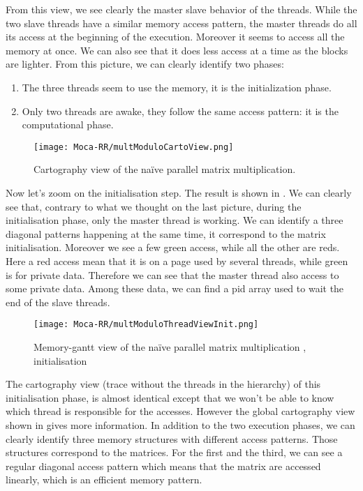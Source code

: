 From this view, we see clearly the master slave behavior of the threads.
While the two slave threads have a similar memory access pattern, the master threads do all its access at the beginning of the execution.
Moreover it seems to access all the memory at once.
We can also see that it does less access at a time as the blocks are lighter.
From this picture, we can clearly identify two phases:
\begin{enumerate}
    \item The three threads seem to use the memory, it is the initialization phase.
    \item Only two threads are awake, they follow the same access pattern: it
        is the computational phase.
\end{enumerate}

\begin{figure}[htb]
    \centering
    \texttt{[image: Moca-RR/multModuloCartoView.png]}
    \caption{Cartography view of the naïve parallel matrix multiplication.}
    \label{fig:ocelotl-carto0}
\end{figure}

Now let's zoom on the initialisation step.
The result is shown in .
We can clearly see that, contrary to what we thought on the last picture, during the initialisation phase, only the master thread is working.
We can identify a three diagonal patterns happening at the same time, it correspond to the matrix initialisation.
Moreover we see a few green access, while all the other are reds.
Here a red access mean that it is on a page used by several threads, while green is for private data.
Therefore we can see that the master thread also access to some private data.
Among these data, we can find a pid array used to wait the end of the slave threads.

\begin{figure}[htb]
    \centering
    \texttt{[image: Moca-RR/multModuloThreadViewInit.png]}
    \caption{Memory-gantt view of the naïve parallel matrix multiplication ,
    initialisation}
    \label{fig:ocelotl-th1}
\end{figure}

The cartography view (trace without the threads in the hierarchy) of this initialisation phase, is almost identical except that we won't be able to know which thread is responsible for the accesses.
However the global cartography view shown in  gives more information.
In addition to the two execution phases, we can clearly identify three memory structures with different access patterns.
Those structures correspond to the matrices.
For the first and the third, we can see a regular diagonal access pattern which means that the matrix are accessed linearly, which is an efficient memory pattern.

